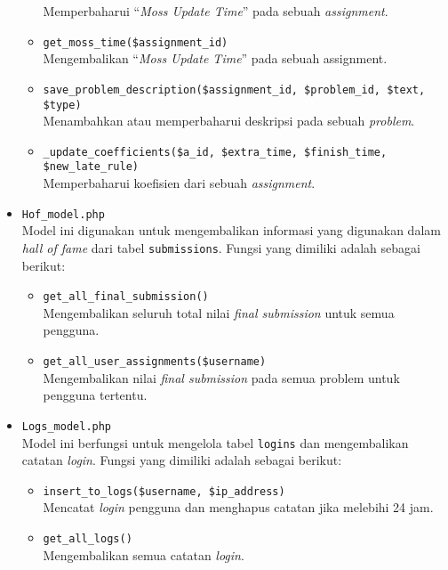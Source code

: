 \begin{itemize}
\begin{itemize}
		            Memperbaharui ``\textit{Moss Update Time}'' pada sebuah \textit{assignment}.
		      \item \verb|get_moss_time($assignment_id)| \\
		            Mengembalikan ``\textit{Moss Update Time}'' pada sebuah assignment.
		      \item \verb|save_problem_description($assignment_id, $problem_id, $text, $type)| \\
		            Menambahkan atau memperbaharui deskripsi pada sebuah \textit{problem}.
		      \item \verb|_update_coefficients($a_id, $extra_time, $finish_time, $new_late_rule)| \\
		            Memperbaharui koefisien dari sebuah \textit{assignment}.
	      \end{itemize}

	\item \verb|Hof_model.php| \\
	      Model ini digunakan untuk mengembalikan informasi yang digunakan dalam \textit{hall of fame} dari tabel \verb|submissions|. Fungsi yang dimiliki adalah sebagai berikut:

	      \begin{itemize}
		      \item \verb|get_all_final_submission()| \\
		            Mengembalikan seluruh total nilai \textit{final submission} untuk semua pengguna.
		      \item \verb|get_all_user_assignments($username)| \\
		            Mengembalikan nilai \textit{final submission} pada semua problem untuk pengguna tertentu.
	      \end{itemize}

	\item \verb|Logs_model.php| \\
	      Model ini berfungsi untuk mengelola tabel \verb|logins| dan mengembalikan catatan \textit{login}. Fungsi yang dimiliki adalah sebagai berikut:

	      \begin{itemize}
		      \item \verb|insert_to_logs($username, $ip_address)| \\
		            Mencatat \textit{login} pengguna dan menghapus catatan jika melebihi 24 jam.
		      \item \verb|get_all_logs()| \\
		            Mengembalikan semua catatan \textit{login}.
	      \end{itemize}


\end{itemize}

